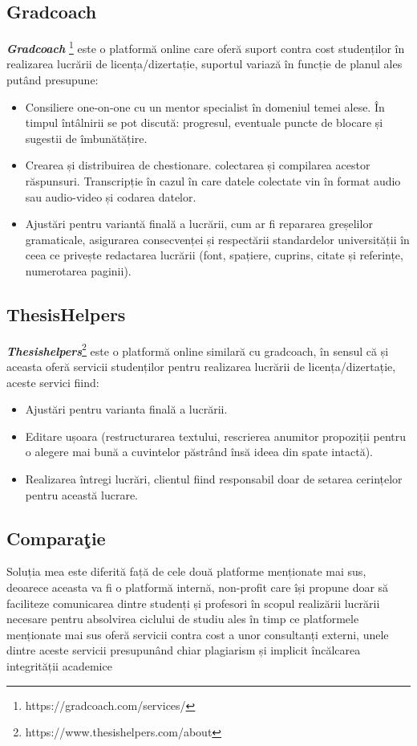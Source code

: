 \documentclass[12pt,a4paper,hidelinks]{report}
\theoremstyle{definition}
\theoremstyle{remark}
\begin{document}
\subsection{Gradcoach}
\textbf{\textit{Gradcoach}} \footnote[1]{https://gradcoach.com/services/} este o platformă online care oferă suport contra cost studenților în realizarea lucrării de licența/dizertație, suportul variază în funcție de planul ales putând presupune:
\begin{itemize}
    \item Consiliere one-on-one cu un mentor specialist în domeniul temei alese. În timpul întâlnirii se pot discută: progresul, eventuale puncte de blocare și sugestii de îmbunătățire.
    \item Crearea și distribuirea de chestionare. colectarea și compilarea acestor răspunsuri. Transcripție în cazul în care datele colectate vin în format audio sau audio-video și codarea datelor.
    \item Ajustări pentru variantă finală a lucrării, cum ar fi repararea greșelilor gramaticale, asigurarea consecvenței și respectării standardelor universității în ceea ce privește redactarea lucrării (font, spațiere, cuprins, citate și referințe, numerotarea paginii).
\end{itemize}




\subsection{ThesisHelpers}
\textbf{\textit{Thesishelpers}}\footnote[2]{https://www.thesishelpers.com/about} este o platformă online similară cu gradcoach, în sensul că și aceasta oferă servicii studenților pentru realizarea lucrării de licența/dizertație, aceste servici fiind: 
\begin{itemize}
    \item Ajustări pentru varianta finală a lucrării.
    \item Editare ușoara (restructurarea textului, rescrierea anumitor propoziții pentru o alegere mai bună a cuvintelor păstrând însă ideea din spate intactă).
    \item Realizarea întregi lucrări, clientul fiind responsabil doar de setarea cerințelor pentru această lucrare.
\end{itemize} 
\subsection{Compara\c tie}
Soluția mea este diferită față de cele două platforme menționate mai sus, deoarece aceasta va fi o platformă internă, non-profit care își propune doar să faciliteze comunicarea dintre studenți și profesori în scopul realizării lucrării necesare pentru absolvirea ciclului de studiu ales în timp ce platformele menționate mai sus oferă servicii contra cost a unor consultanți externi, unele dintre aceste servicii presupunând chiar plagiarism și implicit încălcarea integrității academice
\end{document}
